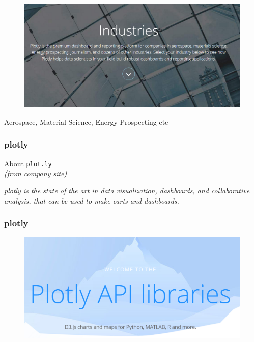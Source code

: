 \documentclass{beamer}
\begin{document}
\begin{frame}
	\vspace{-0.5cm}
	\begin{figure}
		\centering
		\includegraphics[width=1.05\linewidth]{plotlyindustry}
	\end{figure}
	Aerospace, Material Science, Energy Prospecting etc
\end{frame}
\begin{frame}
\frametitle{plotly}
\Large	
About \texttt{plot.ly}\\
\textit{ (from company site)}

\begin{framed}

\textit{plotly is the state of the art in data visualization, dashboards, and collaborative analysis, that can be used to make carts and dashboards.}
\end{framed}
\end{frame}
\begin{frame}
\frametitle{plotly}
\Large
\begin{figure}
\centering
\includegraphics[width=1.05\linewidth]{plotlyapis1}
\end{figure}

\end{frame}
\end{document}

